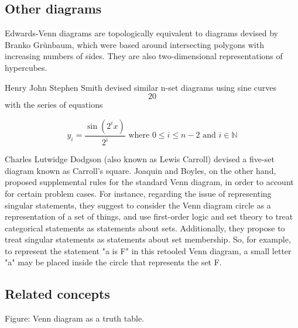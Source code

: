 \subsection{Other diagrams}
\label{sss:othe-06e2}




Edwards-Venn diagrams are topologically equivalent to diagrams devised by Branko Grünbaum,
which were based around intersecting polygons with increasing numbers of sides. They are
also two-dimensional representations of hypercubes.



Henry John Stephen Smith devised similar n-set diagrams using sine curves\[20\] with the
series of equations



$$y_i = \frac{\sin\left(2^i x\right)}{2^i} \text{ where } 0 \leq i \leq n-2 \text{ and } i \in \mathbb{N}$$



Charles Lutwidge Dodgson (also known as Lewis Carroll) devised a five-set diagram known as
Carroll's square. Joaquin and Boyles, on the other hand, proposed supplemental rules for
the standard Venn diagram, in order to account for certain problem cases. For instance,
regarding the issue of representing singular statements, they suggest to consider the Venn
diagram circle as a representation of a set of things, and use first-order logic and set
theory to treat categorical statements as statements about sets. Additionally, they
propose to treat singular statements as statements about set membership. So, for example,
to represent the statement "a is F" in this retooled Venn diagram, a small letter "a" may
be placed inside the circle that represents the set F.




\subsection{Related concepts}
\label{sss:rela-3d85}







Figure: Venn diagram as a truth table.



